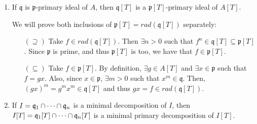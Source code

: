 \begin{problem}
\begin{enumerate}[label=(\theproblem.\arabic*),ref=\theproblem.\arabic*]
\begin{sol}
\begin{proof}
                Now, let $\mathfrak{p}$ be a minimal prime of $I$.
                $\mathfrak{p}[T]$ must contain a minimal prime of $I[T]$, say, $\mathfrak{p}'[T]$
                Then, we take the contraction $I \subseteq \mathfrak{p}' \subseteq \mathfrak{p}$
                and by definition of $\mathfrak{p}$ being a minimal of $I$,
                we conclude that $\mathfrak{p}' = \mathfrak{p}$ and $\mathfrak{p}'[T] = \mathfrak{p}[T]$.
                Thus, $\mathfrak{p}[T]$ is a minimal prime of $I[T]$.

            \end{proof}
        \end{sol}

        \item If $\mathfrak{q}$ is $\mathfrak{p}$-primary ideal of $A$, then $\mathfrak{q}[T]$ is a $\mathfrak{p}[T]$-primary ideal of $A[T]$.
        \begin{sol}
            We will prove both inclusions of $\mathfrak{p}[T] = rad(\mathfrak{q}[T])$ separately:
            \begin{itemize}
                \item[$(\supseteq)$]
                Take $f \in rad(\mathfrak{q}[T])$.
                Then $\exists n>0$ such that $f^n \in \mathfrak{q}[T] \subseteq \mathfrak{p}[T]$.
                Since $\mathfrak{p}$ is prime, and thus $\mathfrak{p}[T]$ is too, we have that $f \in \mathfrak{p}[T]$.
                \item[$(\subseteq)$]
                Take $f \in \mathfrak{p}[T]$.
                By definition, $\exists g \in A[T]$ and $\exists x \in \mathfrak{p}$ such that $f = g x$.
                Also, since $x \in \mathfrak{p}$, $\exists m>0$ such that $x^m \in \mathfrak{q}$.
                Then, $( g x )^m = g^m x^m \in \mathfrak{q}[T]$ and thus $g x = f \in rad(\mathfrak{q}[T])$.
            \end{itemize}
        \end{sol}

        \item If $I = \mathfrak{q}_1 \cap \cdots \cap \mathfrak{q}_n$ is a minimal decomposition of $I$, then $I[T] = \mathfrak{q}_1[T] \cap \cdots \cap \mathfrak{q}_n[T]$ is a minimal primary decomposition of $I[T]$.
        \begin{sol}
        \end{sol}

    \end{enumerate}
\end{problem}